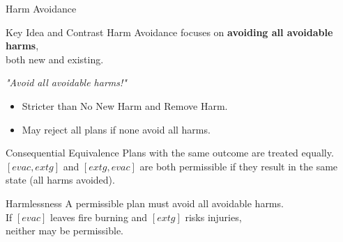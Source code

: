 \documentclass[compress,xcolor=table]{beamer}
\begin{document}
\begin{frame}{Harm Avoidance}
    \begin{block}{Key Idea and Contrast}
        Harm Avoidance focuses on \textbf{avoiding all avoidable harms}, \\
        both new and existing. \\
        \begin{center}
            \textit{"Avoid all avoidable harms!"}
        \end{center}
        \begin{itemize}
            \item Stricter than No New Harm and Remove Harm.
            \item May reject all plans if none avoid all harms.
        \end{itemize}
    \end{block}
    \tiny
    \begin{block}{Consequential Equivalence}
        Plans with the same outcome are treated equally.\\
        $[evac, extg]$ and $[extg, evac]$ are both permissible if they result in the same state (all harms avoided).
    \end{block}

    \begin{block}{Harmlessness}
        A permissible plan must avoid all avoidable harms.\\
        If $[evac]$ leaves fire burning and $[extg]$ risks injuries, \\
        neither may be permissible.
    \end{block}
\end{frame}
\end{document}

